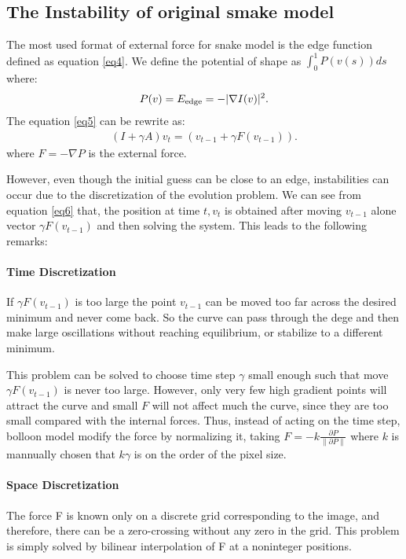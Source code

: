\documentclass[journal]{IEEEtran}
\begin{document}
\subsection{The Instability of original smake model}
The most used format of external force for snake model is the edge function defined as equation \ref{eq4}. We define the potential of shape as $\int_0^1 P(v(s))ds$ where:
\begin{equation}\begin{aligned}
P(v)=E_{\text{edge}}=-|\nabla I(v)|^2.\notag
\end{aligned}\end{equation}
The equation \ref{eq5} can be rewrite as:
\begin{equation}\begin{aligned}
(I+\gamma A)v_t=(v_{t-1}+\gamma F(v_{t-1})).\label{eq6}
\end{aligned}\end{equation}
where $F=-\nabla P$ is the external force.

However, even though the initial guess can be close to an edge, instabilities can occur due to the discretization of the evolution problem. We can see from equation \ref{eq6} that, the position at time $t, v_t$ is obtained after moving $v_{t-1}$ alone vector $\gamma F(v_{t-1})$ and then solving the system. This leads to the following remarks:
\paragraph{Time Discretization} If $\gamma F(v_{t-1})$ is too large the point $v_{t-1}$ can be moved too far across the desired minimum and never come back. So the curve can pass through the dege and then make large oscillations without reaching equilibrium, or stabilize to a different minimum.

This problem can be solved to choose time step $\gamma$ small enough such that move $\gamma F(v_{t-1})$ is never too large. However, only very few high gradient points will attract the curve and small $F$ will not affect much the curve, since they are too small compared with the internal forces. Thus, instead of acting on the time step, bolloon model modify the force by normalizing it, taking $F=-k\frac{\partial P}{\|\partial P\|}$ where $k$ is mannually chosen that $k\gamma$ is on the order of the pixel size.

\paragraph{Space Discretization}The force F is known only on a discrete grid corresponding to the image, and therefore, there can be a zero-crossing without any zero in the grid. This problem is simply solved by bilinear interpolation of F at a noninteger positions.
\end{document}
